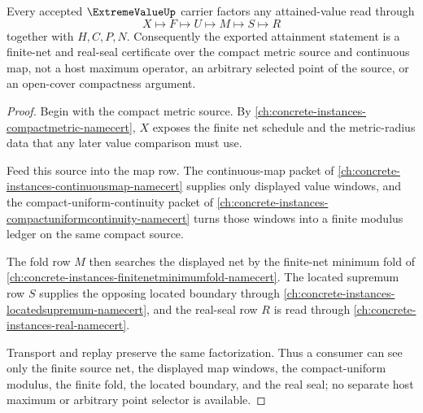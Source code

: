 \begin{theorem}
\label{thm:extreme-value-finite-net-attainment}
Every accepted $\ExtremeValueUp$ carrier factors any attained-value read through
$$
X\longmapsto F\longmapsto U\longmapsto M\longmapsto S\longmapsto R
$$
together with $H,C,P,N$. Consequently the exported attainment statement is a finite-net and real-seal certificate over the compact metric source and continuous map, not a host maximum operator, an arbitrary selected point of the source, or an open-cover compactness argument.
\end{theorem}
\begin{proof}
Begin with the compact metric source. By \autoref{ch:concrete-instances-compactmetric-namecert}, $X$ exposes the finite net schedule and the metric-radius data that any later value comparison must use.

Feed this source into the map row. The continuous-map packet of \autoref{ch:concrete-instances-continuousmap-namecert} supplies only displayed value windows, and the compact-uniform-continuity packet of \autoref{ch:concrete-instances-compactuniformcontinuity-namecert} turns those windows into a finite modulus ledger on the same compact source.

The fold row $M$ then searches the displayed net by the finite-net minimum fold of \autoref{ch:concrete-instances-finitenetminimumfold-namecert}. The located supremum row $S$ supplies the opposing located boundary through \autoref{ch:concrete-instances-locatedsupremum-namecert}, and the real-seal row $R$ is read through \autoref{ch:concrete-instances-real-namecert}.

Transport and replay preserve the same factorization. Thus a consumer can see only the finite source net, the displayed map windows, the compact-uniform modulus, the finite fold, the located boundary, and the real seal; no separate host maximum or arbitrary point selector is available.
\end{proof}

